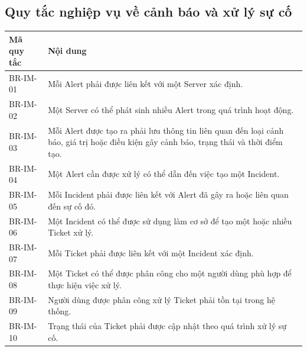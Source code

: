 \subsection{Quy tắc nghiệp vụ về cảnh báo và xử lý sự cố}
\begin{center}
\begin{longtable}{|>{\raggedright\arraybackslash}p{3.5cm}|>{\raggedright\arraybackslash}p{11.0cm}|}
\hline
\textbf{Mã quy tắc} & \textbf{Nội dung} \\ \hline
\endhead
BR-IM-01 & Mỗi Alert phải được liên kết với một Server xác định. \\ \hline
BR-IM-02 & Một Server có thể phát sinh nhiều Alert trong quá trình hoạt động. \\ \hline
BR-IM-03 & Mỗi Alert được tạo ra phải lưu thông tin liên quan đến loại cảnh báo, giá trị hoặc điều kiện gây cảnh báo, trạng thái và thời điểm tạo. \\ \hline
BR-IM-04 & Một Alert cần được xử lý có thể dẫn đến việc tạo một Incident. \\ \hline
BR-IM-05 & Mỗi Incident phải được liên kết với Alert đã gây ra hoặc liên quan đến sự cố đó. \\ \hline
BR-IM-06 & Một Incident có thể được sử dụng làm cơ sở để tạo một hoặc nhiều Ticket xử lý. \\ \hline
BR-IM-07 & Mỗi Ticket phải được liên kết với một Incident xác định. \\ \hline
BR-IM-08 & Một Ticket có thể được phân công cho một người dùng phù hợp để thực hiện việc xử lý. \\ \hline
BR-IM-09 & Người dùng được phân công xử lý Ticket phải tồn tại trong hệ thống. \\ \hline
BR-IM-10 & Trạng thái của Ticket phải được cập nhật theo quá trình xử lý sự cố. \\ \hline
\end{longtable}
\end{center}

